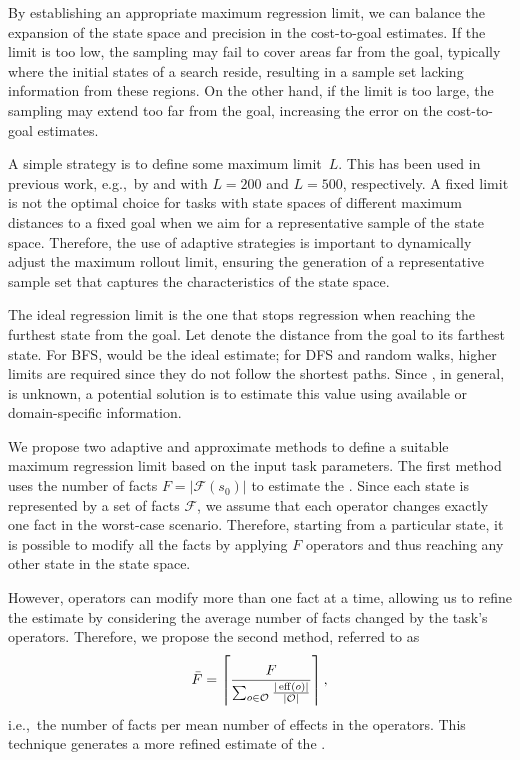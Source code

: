By establishing an appropriate maximum regression limit, we can balance the expansion of the state space and precision in the cost-to-goal estimates. If the limit is too low, the sampling may fail to cover areas far from the goal, typically where the initial states of a search reside, resulting in a sample set lacking information from these regions. On the other hand, if the limit is too large, the sampling may extend too far from the goal, increasing the error on the cost-to-goal estimates.

A simple strategy is to define some maximum limit~$L$. This has been used in previous work, e.g.,~by \citet{yu2020learning} and \citet{otoole2022sampling} with $L=200$ and $L=500$, respectively. A fixed limit is not the optimal choice for tasks with state spaces of different maximum distances to a fixed goal when we aim for a representative sample of the state space. Therefore, the use of adaptive strategies is important to dynamically adjust the maximum rollout limit, ensuring the generation of a representative sample set that captures the characteristics of the state space.

The ideal regression limit is the one that stops regression when reaching the furthest state from the goal. Let \ssdiameter denote the distance from the goal to its farthest state. For BFS, \ssdiameter would be the ideal estimate; for DFS and random walks, higher limits are required since they do not follow the shortest paths. Since \ssdiameter, in general, is unknown, a potential solution is to estimate this value using available or domain-specific information.

We propose two adaptive and approximate methods to define a suitable maximum regression limit based on the input task parameters. The first method uses the number of facts $F = |\mathcal{F}(s_0)|$ to estimate the \ssdiameter. Since each state is represented by a set of facts $\mathcal{F}$, we assume that each operator changes exactly one fact in the worst-case scenario. Therefore, starting from a particular state, it is possible to modify all the facts by applying $F$ operators and thus reaching any other state in the state space.

However, operators can modify more than one fact at a time, allowing us to refine the estimate by considering the average number of facts changed by the task's operators. Therefore, we propose the second method, referred to as~$$\bar F=\left\lceil \frac{F}{\sum_{o\in \mathcal{O}} \frac{|\operatorname{eff}(o)|}{|\mathcal{O}|}}\right\rceil,$$ i.e.,~the number of facts per mean number of effects in the operators. This technique generates a more refined estimate of the \ssdiameter.

